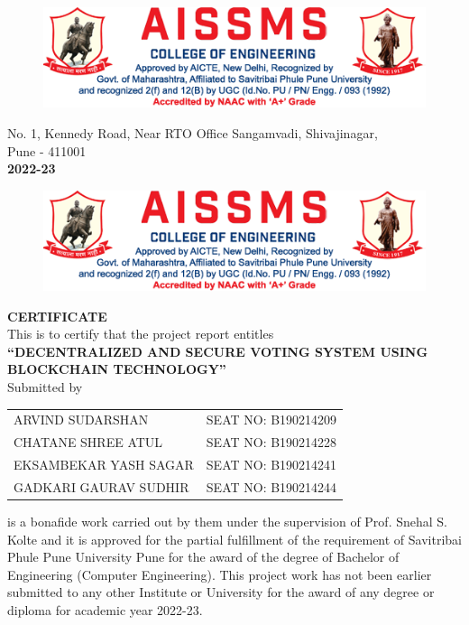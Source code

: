 \documentclass[oneside, 12pt]{book}
\begin{document}
\begin{titlepage}
\begin{figure}[H]
			\includegraphics[width=\linewidth]{./Resources/letterhead2.png}
		\end{figure}
		No. 1, Kennedy Road, Near RTO Office Sangamvadi, Shivajinagar,\\Pune - 411001
		\\\textbf{\large 2022-23}
		\restoregeometry
	\end{titlepage}
	
	\begin{titlepage}
		{\centering
		\begin{figure}[H]
			\centering
			\includegraphics[width=\linewidth]{./Resources/letterhead2.png}
		\end{figure}
		{\Large\textbf{CERTIFICATE}}\break
		\\This is to certify that the project report entitles\break
		\\{\large\textbf{“DECENTRALIZED AND SECURE VOTING SYSTEM USING BLOCKCHAIN TECHNOLOGY”}}\break
		\\Submitted by\break
		\begin{table}[H]
			\centering
			\begin{tabular}{lr}
				ARVIND SUDARSHAN      & SEAT NO: B190214209 \\
				CHATANE SHREE ATUL    & SEAT NO: B190214228 \\
				EKSAMBEKAR YASH SAGAR & SEAT NO: B190214241 \\
				GADKARI GAURAV SUDHIR & SEAT NO: B190214244
			\end{tabular}
		\end{table}}
		is a bonafide work carried out by them under the supervision of Prof. Snehal S. Kolte and it is approved for the partial fulfillment of the requirement of Savitribai Phule Pune University Pune for the award of the degree of Bachelor of Engineering (Computer Engineering). This project work has not been earlier submitted to any other Institute or University for the award of any degree or diploma for academic year 2022-23.\\\\\\\\

\end{titlepage}
\end{document}
